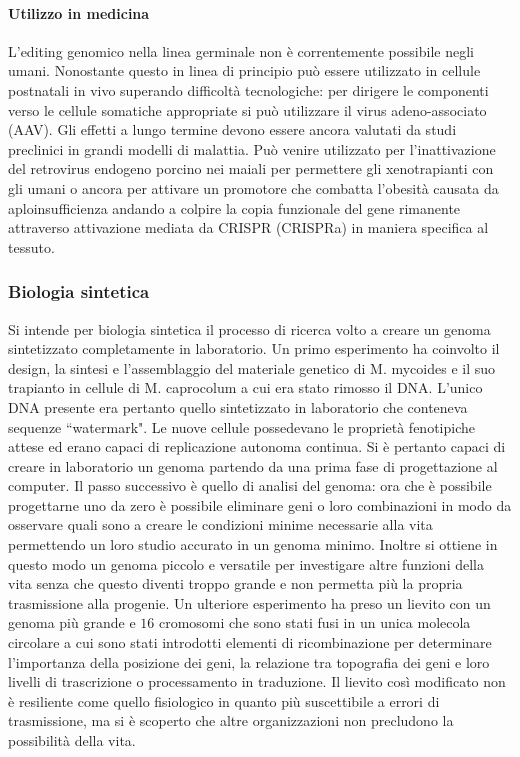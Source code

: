 \paragraph{Utilizzo in medicina}
L'editing genomico nella linea germinale non \`e correntemente possibile negli umani. Nonostante questo in linea di principio pu\`o essere utilizzato in cellule postnatali in vivo 
superando difficolt\`a tecnologiche: per dirigere le componenti verso le cellule somatiche appropriate si pu\`o utilizzare il virus adeno-associato (AAV). Gli effetti a lungo termine 
devono essere ancora valutati da studi preclinici in grandi modelli di malattia. Pu\`o venire utilizzato per l'inattivazione del retrovirus endogeno porcino nei maiali per permettere
gli xenotrapianti con gli umani o ancora per attivare un promotore che combatta l'obesit\`a causata da aploinsufficienza andando a colpire la copia funzionale del gene rimanente 
attraverso attivazione mediata da CRISPR (CRISPRa) in maniera specifica al tessuto. 
\subsubsection{Biologia sintetica}
Si intende per biologia sintetica il processo di ricerca volto a creare un genoma sintetizzato completamente in laboratorio. Un primo esperimento ha coinvolto il design, la sintesi 
e l'assemblaggio del materiale genetico di M. mycoides e il suo trapianto in cellule di M. caprocolum a cui era stato rimosso il DNA. L'unico DNA presente era pertanto quello 
sintetizzato in laboratorio che conteneva sequenze ``watermark". Le nuove cellule possedevano le propriet\`a fenotipiche attese ed erano capaci di replicazione autonoma continua. Si
\`e pertanto capaci di creare in laboratorio un genoma partendo da una prima fase di progettazione al computer. Il passo successivo \`e quello di analisi del genoma: ora che \`e 
possibile progettarne uno da zero \`e possibile eliminare geni o loro combinazioni in modo da osservare quali sono a creare le condizioni minime necessarie alla vita permettendo un
loro studio accurato in un genoma minimo. Inoltre si ottiene in questo modo un genoma piccolo e versatile per investigare altre funzioni della vita senza che questo diventi troppo 
grande e non permetta pi\`u la propria trasmissione alla progenie. Un ulteriore esperimento ha preso un lievito con un genoma pi\`u grande e $16$ cromosomi che sono stati fusi in un
unica molecola circolare a cui sono stati introdotti elementi di ricombinazione per determinare l'importanza della posizione dei geni, la relazione tra topografia dei geni e loro
livelli di trascrizione o processamento in traduzione. Il lievito cos\`i modificato non \`e resiliente come quello fisiologico in quanto pi\`u suscettibile a errori di trasmissione, 
ma si \`e scoperto che altre organizzazioni non precludono la possibilit\`a della vita. 

